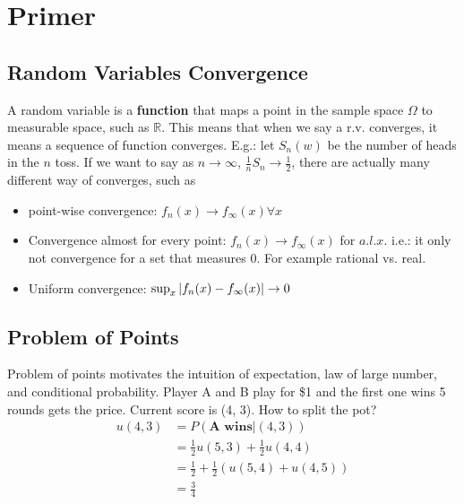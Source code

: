 \chapter{Primer} 

\section{Random Variables Convergence}
A random variable is a \textbf{function} that maps a point in the sample space $\Omega$ to measurable space, such as $\mathbb{R}$. This means that when we say a r.v. converges, it means a sequence of function converges. E.g.: let $S_n(w)$ be the number of heads in the $n$ toss. If we want to say as $n\to \infty$, $\frac{1}{n} S_n \to \frac{1}{2}$, there are actually many different way of converges, such as 
    \begin{itemize}
        \item point-wise convergence: $f_n(x) \to f_\infty(x) \forall x$
        \item Convergence almost for every point: $f_n(x) \to f_\infty(x)$ for $a.l.x$. i.e.: it only not convergence for a set that measures 0. For example rational vs. real. 
        \item Uniform convergence: $\sup_x \left| f_n(x) - f_\infty(x) \right| \to 0$
    \end{itemize}

\section{Problem of Points} 
Problem of points motivates the intuition of expectation, law of large number, and conditional probability. Player A and B play for \$1 and the first one wins 5 rounds gets the price. Current score is (4, 3). How to split the pot? 
    \begin{align*}
        u(4,3) 
        & = P( \textbf{A wins} | (4,3)) \\
        & = \frac{1}{2} u(5,3) + \frac{1}{2}u(4,4)\\
        & = \frac{1}{2} + \frac{1}{2}(u(5,4) + u(4,5)) \\
        & = \frac{3}{4}
    \end{align*}